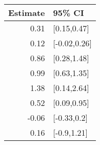 \begin{tabular}{rl}
  \hline
Estimate & 95\% CI \\ 
  \hline
0.31 & [0.15,0.47] \\ 
  0.12 & [-0.02,0.26] \\ 
  0.86 & [0.28,1.48] \\ 
  0.99 & [0.63,1.35] \\ 
  1.38 & [0.14,2.64] \\ 
  0.52 & [0.09,0.95] \\ 
  -0.06 & [-0.33,0.2] \\ 
  0.16 & [-0.9,1.21] \\ 
   \hline
\end{tabular}

